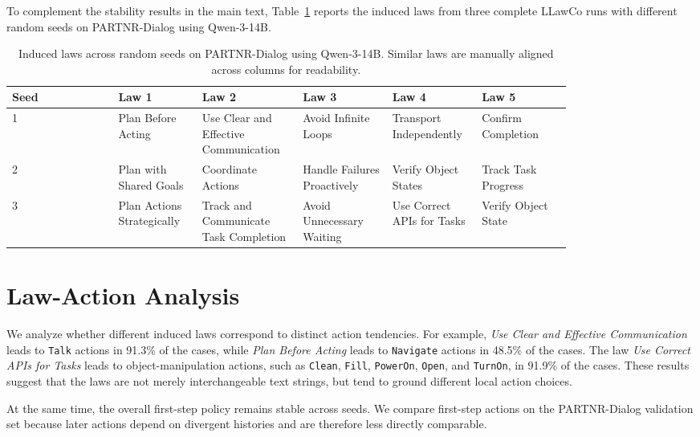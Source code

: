 \documentclass{article}
\theoremstyle{plain}
\theoremstyle{definition}
\theoremstyle{remark}
\newcommand{\name}{LLawCo\xspace}
\begin{document}
To complement the stability results in the main text, Table~\ref{tab:seed-stability} reports the induced laws from three complete \name runs with different random seeds on PARTNR-Dialog using Qwen-3-14B.

\begin{table}[htbp]
\centering
\small
\setlength{\tabcolsep}{3pt}
\caption{Induced laws across random seeds on PARTNR-Dialog using Qwen-3-14B. Similar laws are manually aligned across columns for readability.}
\label{tab:seed-stability}
\begin{tabular}{l|p{0.15\linewidth}p{0.18\linewidth}p{0.16\linewidth}p{0.16\linewidth}p{0.16\linewidth}}
\toprule
\textbf{Seed} & \textbf{Law 1} & \textbf{Law 2} & \textbf{Law 3} & \textbf{Law 4} & \textbf{Law 5} \\
\midrule
1 & Plan Before Acting & Use Clear and Effective Communication & Avoid Infinite Loops & Transport Independently & Confirm Completion \\
\midrule
2 & Plan with Shared Goals & Coordinate Actions & Handle Failures Proactively & Verify Object States & Track Task Progress \\
\midrule
3 & Plan Actions Strategically & Track and Communicate Task Completion & Avoid Unnecessary Waiting & Use Correct APIs for Tasks & Verify Object State \\
\bottomrule
\end{tabular}
\end{table}

\section{Law-Action Analysis}
\label{sec:appendix-law-action}

We analyze whether different induced laws correspond to distinct action tendencies. For example, \textit{Use Clear and Effective Communication} leads to \texttt{Talk} actions in 91.3\% of the cases, while \textit{Plan Before Acting} leads to \texttt{Navigate} actions in 48.5\% of the cases. The law \textit{Use Correct APIs for Tasks} leads to object-manipulation actions, such as \texttt{Clean}, \texttt{Fill}, \texttt{PowerOn}, \texttt{Open}, and \texttt{TurnOn}, in 91.9\% of the cases. These results suggest that the laws are not merely interchangeable text strings, but tend to ground different local action choices.

At the same time, the overall first-step policy remains stable across seeds. We compare first-step actions on the PARTNR-Dialog validation set because later actions depend on divergent histories and are therefore less directly comparable.
\end{document}

